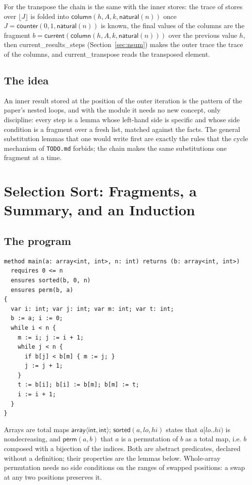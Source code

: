 \documentclass[11pt,a4paper]{article}
\newcommand{\bl}[1]{\lfloor #1\rfloor}                       %
\newcommand{\cnt}{\mathsf{counter}}
\newcommand{\cur}{\mathsf{current}}
\newcommand{\natf}{\mathsf{natural}}
\newcommand{\sorted}{\mathsf{sorted}}
\newcommand{\perm}{\mathsf{perm}}
\newcommand{\lemma}[1]{\textsf{#1}}
\begin{document}
For the transpose the chain is the same with the inner stores: the trace of stores over $\bl{J}$ is folded
into $\mathsf{column}(h, A, k, \natf(n))$ once $J = \cnt(0, 1, \natf(n))$ is known, the final values of the
columns are the fragment $b = \cur(\mathsf{column}(h, A, k, \natf(n)))$ over the previous value $h$, then
\lemma{current\_results\_steps} (Section~\ref{sec:nsum}) makes the outer trace the trace of the columns, and
\lemma{current\_transpose} reads the transposed element.

\subsection{The idea}
An inner result stored at the position of the outer iteration is the pattern of the paper's nested loops,
and with the module it needs no new concept, only discipline: every step is a lemma whose left-hand side is
specific and whose side condition is a fragment over a fresh list, matched against the facts. The general
substitution lemmas that one would write first are exactly the rules that the cycle mechanism of
\texttt{TODO.md} forbids; the chain makes the same substitutions one fragment at a time.

\section{Selection Sort: Fragments, a Summary, and an Induction}\label{sec:sel}

\subsection{The program}

\begin{lstlisting}
method main(a: array<int, int>, n: int) returns (b: array<int, int>)
  requires 0 <= n
  ensures sorted(b, 0, n)
  ensures perm(b, a)
{
  var i: int; var j: int; var m: int; var t: int;
  b := a; i := 0;
  while i < n {
    m := i; j := i + 1;
    while j < n {
      if b[j] < b[m] { m := j; }
      j := j + 1;
    }
    t := b[i]; b[i] := b[m]; b[m] := t;
    i := i + 1;
  }
}
\end{lstlisting}

\noindent
Arrays are total maps $\mathsf{array}\langle\mathsf{int},\mathsf{int}\rangle$; $\sorted(a, lo, hi)$
states that $a[lo..hi)$ is nondecreasing, and $\perm(a, b)$ that $a$ is a permutation of $b$ as a total
map, i.e. $b$ composed with a bijection of the indices. Both are abstract predicates, declared without
a definition; their properties are the lemmas below. Whole-array permutation needs no side conditions
on the ranges of swapped positions: a swap at any two positions preserves it.
\end{document}
